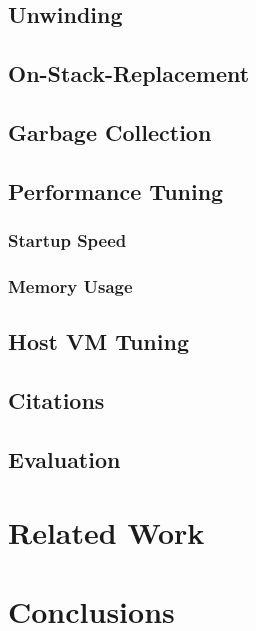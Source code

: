 \documentclass{acm_proc_article-sp}
\begin{document}
\subsection{Unwinding}

\subsection{On-Stack-Replacement}

\subsection{Garbage Collection}

\subsection{Performance Tuning}

\subsubsection{Startup Speed}

\subsubsection{Memory Usage}

\subsection{Host VM Tuning}

\subsection{Citations}

\subsection{Evaluation}

\section{Related Work}

\section{Conclusions}


\end{document}

